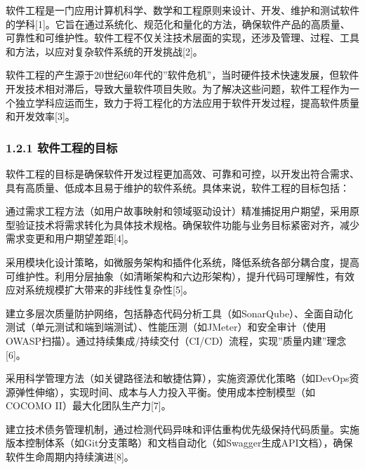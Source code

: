 软件工程是一门应用计算机科学、数学和工程原则来设计、开发、维护和测试软件的学科{[}1{]}。它旨在通过系统化、规范化和量化的方法，确保软件产品的高质量、可靠性和可维护性。软件工程不仅关注技术层面的实现，还涉及管理、过程、工具和方法，以应对复杂软件系统的开发挑战{[}2{]}。

软件工程的产生源于20世纪60年代的''软件危机''，当时硬件技术快速发展，但软件开发技术相对滞后，导致大量软件项目失败。为了解决这些问题，软件工程作为一个独立学科应运而生，致力于将工程化的方法应用于软件开发过程，提高软件质量和开发效率{[}3{]}。

\hypertarget{ux8f6fux4ef6ux5de5ux7a0bux7684ux76eeux6807}{%
\subsubsection{1.2.1 软件工程的目标}\label{ux8f6fux4ef6ux5de5ux7a0bux7684ux76eeux6807}}

软件工程的目标是确保软件开发过程更加高效、可靠和可控，以开发出符合需求、具有高质量、低成本且易于维护的软件系统。具体来说，软件工程的目标包括：


通过需求工程方法（如用户故事映射和领域驱动设计）精准捕捉用户期望，采用原型验证技术将需求转化为具体技术规格。确保软件功能与业务目标紧密对齐，减少需求变更和用户期望差距{[}4{]}。


采用模块化设计策略，如微服务架构和插件化系统，降低系统各部分耦合度，提高可维护性。利用分层抽象（如清晰架构和六边形架构），提升代码可理解性，有效应对系统规模扩大带来的非线性复杂性{[}5{]}。


建立多层次质量防护网络，包括静态代码分析工具（如SonarQube）、全面自动化测试（单元测试和端到端测试）、性能压测（如JMeter）和安全审计（使用OWASP扫描）。通过持续集成/持续交付（CI/CD）流程，实现''质量内建''理念{[}6{]}。


采用科学管理方法（如关键路径法和敏捷估算），实施资源优化策略（如DevOps资源弹性伸缩），实现时间、成本与人力投入平衡。使用成本控制模型（如COCOMO II）最大化团队生产力{[}7{]}。


建立技术债务管理机制，通过检测代码异味和评估重构优先级保持代码质量。实施版本控制体系（如Git分支策略）和文档自动化（如Swagger生成API文档），确保软件生命周期内持续演进{[}8{]}。


